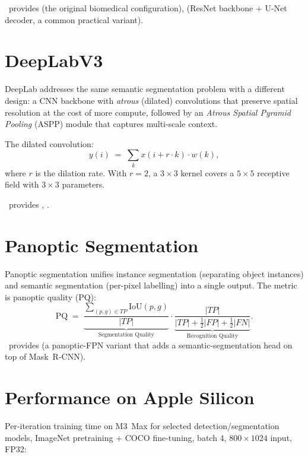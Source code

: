 \Lucid\ provides  (the original biomedical
configuration),  (ResNet backbone +
U-Net decoder, a common practical variant).

\section{DeepLabV3}
\label{sec:detection_segmentation:deeplab}

DeepLab \cite{chen_deeplab_2017} addresses the same semantic
segmentation problem with a different design: a CNN backbone
with \emph{atrous} (dilated) convolutions that preserve spatial
resolution at the cost of more compute, followed by an
\emph{Atrous Spatial Pyramid Pooling} (ASPP) module that captures
multi-scale context.

The dilated convolution:
\[
  y(i) \;=\; \sum_k x(i + r \cdot k) \cdot w(k),
\]
where $r$ is the dilation rate. With $r = 2$, a $3 \times 3$
kernel covers a $5 \times 5$ receptive field with $3 \times 3$
parameters.

\Lucid\ provides ,
.

\section{Panoptic Segmentation}
\label{sec:detection_segmentation:panoptic}

Panoptic segmentation \cite{kirillov_panoptic_2019} unifies
instance segmentation (separating object instances) and semantic
segmentation (per-pixel labelling) into a single output. The
metric is panoptic quality (PQ):
\[
  \mathrm{PQ} \;=\;
  \underbrace{\frac{\sum_{(p,g) \in TP} \mathrm{IoU}(p,g)}{|TP|}}_{\text{Segmentation Quality}}
  \cdot
  \underbrace{\frac{|TP|}{|TP| + \tfrac12|FP| + \tfrac12|FN|}}_{\text{Recognition Quality}}.
\]
\Lucid\ provides  (a
panoptic-FPN variant that adds a semantic-segmentation head on
top of Mask~R-CNN).

\section{Performance on Apple Silicon}
\label{sec:detection_segmentation:perf}

Per-iteration training time on M3~Max for selected
detection/segmentation models, ImageNet pretraining + COCO
fine-tuning, batch 4, $800 \times 1024$ input, FP32:

